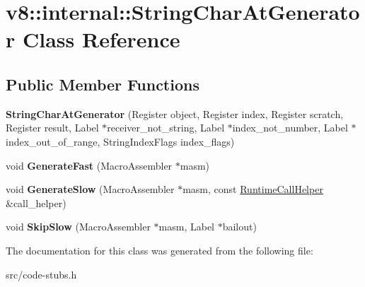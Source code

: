 \hypertarget{classv8_1_1internal_1_1_string_char_at_generator}{}\section{v8\+:\+:internal\+:\+:String\+Char\+At\+Generator Class Reference}
\label{classv8_1_1internal_1_1_string_char_at_generator}
\subsection*{Public Member Functions}
\begin{DoxyCompactItemize}
\item 
\hypertarget{classv8_1_1internal_1_1_string_char_at_generator_a32f3825e8dcbe3f313a396840dec4813}{}{\bfseries String\+Char\+At\+Generator} (Register object, Register index, Register scratch, Register result, Label $\ast$receiver\+\_\+not\+\_\+string, Label $\ast$index\+\_\+not\+\_\+number, Label $\ast$index\+\_\+out\+\_\+of\+\_\+range, String\+Index\+Flags index\+\_\+flags)\label{classv8_1_1internal_1_1_string_char_at_generator_a32f3825e8dcbe3f313a396840dec4813}

\item 
\hypertarget{classv8_1_1internal_1_1_string_char_at_generator_a7f14cda723c20af4ad0a5c8b9f25701a}{}void {\bfseries Generate\+Fast} (Macro\+Assembler $\ast$masm)\label{classv8_1_1internal_1_1_string_char_at_generator_a7f14cda723c20af4ad0a5c8b9f25701a}

\item 
\hypertarget{classv8_1_1internal_1_1_string_char_at_generator_a7ea8cf852e9fe363d2aec35125b520f0}{}void {\bfseries Generate\+Slow} (Macro\+Assembler $\ast$masm, const \hyperlink{classv8_1_1internal_1_1_runtime_call_helper}{Runtime\+Call\+Helper} \&call\+\_\+helper)\label{classv8_1_1internal_1_1_string_char_at_generator_a7ea8cf852e9fe363d2aec35125b520f0}

\item 
\hypertarget{classv8_1_1internal_1_1_string_char_at_generator_a1db77ea0c9200d4f3b3301146aee74b2}{}void {\bfseries Skip\+Slow} (Macro\+Assembler $\ast$masm, Label $\ast$bailout)\label{classv8_1_1internal_1_1_string_char_at_generator_a1db77ea0c9200d4f3b3301146aee74b2}

\end{DoxyCompactItemize}


The documentation for this class was generated from the following file\+:\begin{DoxyCompactItemize}
\item 
src/code-\/stubs.\+h\end{DoxyCompactItemize}
